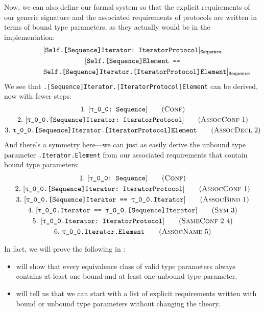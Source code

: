 \documentclass[../generics]{subfiles}
\begin{document}
\begin{example}
Now, we can also define our formal system so that the explicit requirements of our generic signature and the associated requirements of protocols are written in terms of bound type parameters, as they actually would be in the implementation:
\begin{gather*}
[\texttt{Self.[Sequence]Iterator:~IteratorProtocol}]_{\texttt{Sequence}}\\
[\texttt{Self.[Sequence]Element ==}\\
\qquad\qquad\texttt{Self.[Sequence]Iterator.[IteratorProtocol]Element}]_\texttt{Sequence}
\end{gather*}
We see that \texttt{\rT.[Sequence]Iterator.[IteratorProtocol]Element} can be derived, now with fewer steps:
\begin{gather*}
\ConfStep{\rT}{Sequence}{1}\\
\AssocConfStep{1}{\rT.[Sequence]Iterator}{IteratorProtocol}{2}\\
\AssocDeclStep{2}{\rT.[Sequence]Iterator.[IteratorProtocol]Element}{3}
\end{gather*}
And there's a symmetry here---we can just as easily derive the unbound type parameter \texttt{\rT.Iterator.Element} from our associated requirements that contain bound type parameters:
\begin{gather*}
\ConfStep{\rT}{Sequence}{1}\\
\AssocConfStep{1}{\rT.[Sequence]Iterator}{IteratorProtocol}{2}\\
\AssocBindStep{1}{\rT.[Sequence]Iterator}{\rT.Iterator}{3}\\
\SymStep{3}{\rT.Iterator}{\rT.[Sequence]Iterator}{4}\\
\SameConfStep{2}{4}{\rT.Iterator}{IteratorProtocol}{5}\\
\AssocNameStep{5}{\rT.Iterator.Element}{6}
\end{gather*}
\end{example}

In fact, we will prove the following in :
\begin{itemize}
\item {} will show that every equivalence class of valid type parameters always contains at least one bound and at least one unbound type parameter.
\item {} will tell us that we can start with a list of explicit requirements written with bound or unbound type parameters without changing the theory.
\end{itemize}
\end{document}
